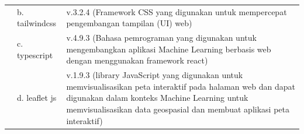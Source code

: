 \begin{singlespace}
\begin{table}[H]
\begin{tabular}{|p{1cm}|p{4cm}|p{7cm}|}
			& b. tailwindcss            & v.3.2.4 (Framework CSS yang digunakan untuk mempercepat pengembangan tampilan (UI) web)                                                                                                                                                                                                                                                           \\ \cline{2-3}
			& c. typescript             & v.4.9.3 (Bahasa pemrograman yang digunakan untuk mengembangkan aplikasi Machine Learning berbasis web dengan menggunakan framework react)                                                                                                                                                                                                         \\ \cline{2-3} 
			\multirow{-4}{*}{} & d. leaflet js             & v.1.9.3 (library JavaScript yang digunakan untuk memvisualisasikan peta interaktif pada halaman web dan dapat digunakan dalam konteks Machine Learning untuk memvisualisasikan data geospasial dan membuat aplikasi peta interaktif)                                                                                                              \\ \hline
		\end{tabular}
	\end{table}
\end{singlespace}

